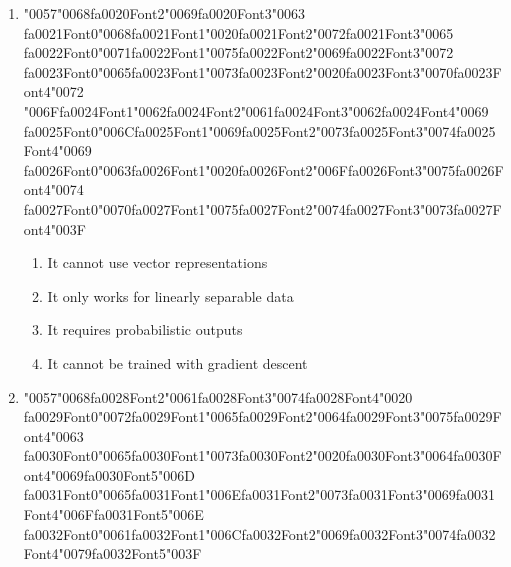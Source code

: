 \documentclass[12pt]{article}
\begin{document}
\begin{enumerate}[label=Q\arabic*.]
\item {\char"0057}{\char"0068}{\csname fa0020Font2\endcsname\char"0069}{\csname fa0020Font3\endcsname\char"0063} {\csname fa0021Font0\endcsname\char"0068}{\csname fa0021Font1\endcsname\char"0020}{\csname fa0021Font2\endcsname\char"0072}{\csname fa0021Font3\endcsname\char"0065} {\csname fa0022Font0\endcsname\char"0071}{\csname fa0022Font1\endcsname\char"0075}{\csname fa0022Font2\endcsname\char"0069}{\csname fa0022Font3\endcsname\char"0072} {\csname fa0023Font0\endcsname\char"0065}{\csname fa0023Font1\endcsname\char"0073}{\csname fa0023Font2\endcsname\char"0020}{\csname fa0023Font3\endcsname\char"0070}{\csname fa0023Font4\endcsname\char"0072} {\char"006F}{\csname fa0024Font1\endcsname\char"0062}{\csname fa0024Font2\endcsname\char"0061}{\csname fa0024Font3\endcsname\char"0062}{\csname fa0024Font4\endcsname\char"0069} {\csname fa0025Font0\endcsname\char"006C}{\csname fa0025Font1\endcsname\char"0069}{\csname fa0025Font2\endcsname\char"0073}{\csname fa0025Font3\endcsname\char"0074}{\csname fa0025Font4\endcsname\char"0069} {\csname fa0026Font0\endcsname\char"0063}{\csname fa0026Font1\endcsname\char"0020}{\csname fa0026Font2\endcsname\char"006F}{\csname fa0026Font3\endcsname\char"0075}{\csname fa0026Font4\endcsname\char"0074} {\csname fa0027Font0\endcsname\char"0070}{\csname fa0027Font1\endcsname\char"0075}{\csname fa0027Font2\endcsname\char"0074}{\csname fa0027Font3\endcsname\char"0073}{\csname fa0027Font4\endcsname\char"003F}
\begin{enumerate}[label=(\Alph*)]
    \item It cannot use vector representations
    \item It only works for linearly separable data
    \item It requires probabilistic outputs
    \item It cannot be trained with gradient descent
\end{enumerate}
\item {\char"0057}{\char"0068}{\csname fa0028Font2\endcsname\char"0061}{\csname fa0028Font3\endcsname\char"0074}{\csname fa0028Font4\endcsname\char"0020} {\csname fa0029Font0\endcsname\char"0072}{\csname fa0029Font1\endcsname\char"0065}{\csname fa0029Font2\endcsname\char"0064}{\csname fa0029Font3\endcsname\char"0075}{\csname fa0029Font4\endcsname\char"0063} {\csname fa0030Font0\endcsname\char"0065}{\csname fa0030Font1\endcsname\char"0073}{\csname fa0030Font2\endcsname\char"0020}{\csname fa0030Font3\endcsname\char"0064}{\csname fa0030Font4\endcsname\char"0069}{\csname fa0030Font5\endcsname\char"006D} {\csname fa0031Font0\endcsname\char"0065}{\csname fa0031Font1\endcsname\char"006E}{\csname fa0031Font2\endcsname\char"0073}{\csname fa0031Font3\endcsname\char"0069}{\csname fa0031Font4\endcsname\char"006F}{\csname fa0031Font5\endcsname\char"006E} {\csname fa0032Font0\endcsname\char"0061}{\csname fa0032Font1\endcsname\char"006C}{\csname fa0032Font2\endcsname\char"0069}{\csname fa0032Font3\endcsname\char"0074}{\csname fa0032Font4\endcsname\char"0079}{\csname fa0032Font5\endcsname\char"003F}

\end{enumerate}
\end{document}
